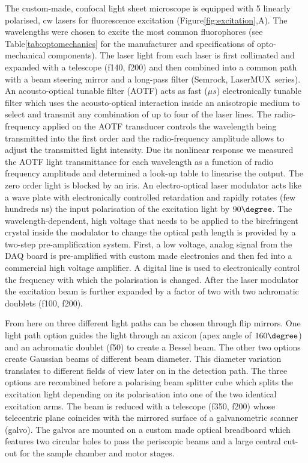 \documentclass[12pt]{spieman}  %
\begin{document}
The custom-made, confocal light sheet microscope is equipped with 5 linearly polarised, cw lasers for fluorescence excitation (Figure\ref{fig:excitation},A). The wavelengths were chosen to excite the most common fluorophores (see Table\ref{tab:optomechanics} for the manufacturer and specifications of opto-mechanical components). The laser light from each laser is first collimated and expanded with a telescope (f140, f200) and then combined into a common path with a beam steering mirror and a long-pass filter (Semrock, LaserMUX\texttrademark\ series). An acousto-optical tunable filter (AOTF) acts as fast ($\mu s$) electronically tunable filter which uses the acousto-optical interaction inside an anisotropic medium to select and transmit any combination of up to four of the laser lines. The radio-frequency applied on the AOTF transducer controls the wavelength being transmitted into the first order and the radio-frequency amplitude allows to adjust the transmitted light intensity. Due its nonlinear response we measured the AOTF light transmittance for each wavelength as a function of radio frequency amplitude and determined a look-up table to linearise the output. The zero order light is blocked by an iris. An electro-optical laser modulator acts like a wave plate with electronically controlled retardation and rapidly rotates (few hundreds ns) the input polarisation of the excitation light by $90\degree$. The wavelength-dependent, high voltage that needs to be applied to the birefringent crystal inside the modulator to change the optical path length is provided by a two-step pre-amplification system. First, a low voltage, analog signal from the DAQ board is pre-amplified with custom made electronics and then fed into a commercial high voltage amplifier. A digital line is used to electronically control the frequency with which the polarisation is changed. After the laser modulator the excitation beam is further expanded by a factor of two with two achromatic doublets (f100, f200). 

From here on three different light paths can be chosen through flip mirrors. One light path option guides the light through an axicon (apex angle of $160\degree$) and an achromatic doublet (f50) to create a Bessel beam. The other two options create Gaussian beams of different beam diameter. This diameter variation translates to different fields of view later on in the detection path. The three options are recombined before a polarising beam splitter cube which splits the excitation light depending on its polarisation into one of the two identical excitation arms. The beam is reduced with a telescope (f350, f200) whose telecentric plane coincides with the mirrored surface of a galvanometric scanner (galvo). The galvos are mounted on a custom made optical breadboard which features two circular holes to pass the periscopic beams and a large central cut-out for the sample chamber and motor stages. 
\end{document}
